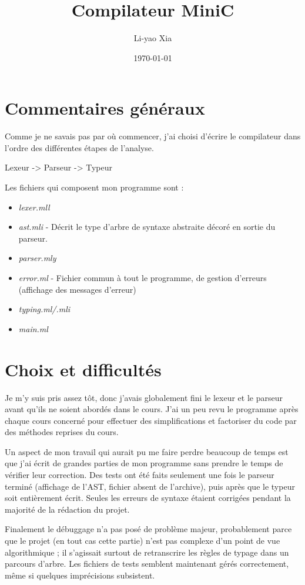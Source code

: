 \documentclass[a4paper]{article}
\begin{document}
\title{Compilateur MiniC}
\author{Li-yao Xia}
\date{\today}

\maketitle

\section{Commentaires généraux}

Comme je ne savais pas par où commencer,
j'ai choisi d'écrire le compilateur dans l'ordre des différentes étapes
de l'analyse. 

Lexeur -> Parseur -> Typeur

Les fichiers qui composent mon programme sont :
\begin{itemize}
  \item {\it lexer.mll}
  \item {\it ast.mli} - Décrit le type d'arbre de syntaxe abstraite décoré en
sortie du parseur.
  \item {\it parser.mly}
  \item {\it error.ml} - Fichier commun à tout le programme, de gestion
d'erreurs (affichage des messages d'erreur)
  \item {\it typing.ml/.mli}
  \item {\it main.ml}
\end{itemize}

\section{Choix et difficultés}

Je m'y suis pris assez tôt, donc j'avais globalement fini le
lexeur et le parseur avant qu'ils ne soient abordés dans le cours.
J'ai un peu revu le programme après chaque cours concerné pour effectuer
des simplifications et factoriser du code par des méthodes reprises du
cours. 

Un aspect de mon travail qui aurait pu me faire perdre beaucoup de temps est que 
j'ai écrit de grandes parties de mon programme sans prendre le temps de
vérifier leur correction. Des tests ont été faits seulement une fois le
parseur terminé (affichage de l'AST, fichier absent de l'archive), puis 
après que le typeur soit entièrement écrit.
Seules les erreurs de syntaxe étaient corrigées
pendant la majorité de la rédaction du projet. 

Finalement le débuggage n'a pas posé de problème majeur, probablement
parce que le projet (en tout cas cette partie) n'est pas complexe d'un
point de vue algorithmique ; il s'agissait surtout de retranscrire les
règles de typage dans un parcours d'arbre. Les fichiers de
tests semblent maintenant gérés correctement, même si quelques
imprécisions subsistent.
\end{document}
